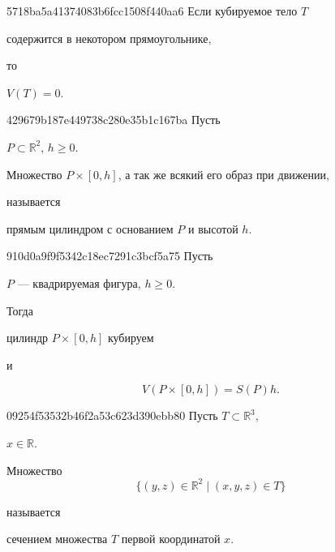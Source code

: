 \begin{note}{5718ba5a41374083b6fcc1508f440aa6}
    Если кубируемое тело \({ T }\) \begin{icloze}{2}содержится в некотором прямоугольнике,\end{icloze} то \begin{icloze}{1}\({ V(T) = 0 }\).\end{icloze}
\end{note}

\begin{note}{429679b187e449738c280e35b1c167ba}
    Пусть \begin{icloze}{3}\({ P \subset \mathbb R^2 }\), \({ h \geqslant 0 }\).\end{icloze}
    \begin{icloze}{1}Множество \({ P \times [0, h] }\), а так же всякий его образ при движении,\end{icloze} называется \begin{icloze}{2}прямым цилиндром с основанием \({ P }\) и высотой \({ h }\).\end{icloze}
\end{note}

\begin{note}{910d0a9f9f5342c18ec7291c3bcf5a75}
    Пусть \begin{icloze}{3}\({ P }\) --- квадрируемая фигура, \({ h \geqslant 0 }\).\end{icloze}
    Тогда \begin{icloze}{1}цилиндр \({ P  \times [0, h] }\) кубируем\end{icloze} и
    \begin{icloze}{2}
        \[
            V(P \times [0, h]) = S(P)h.
        \]
    \end{icloze}
\end{note}

\begin{note}{09254f53532b46f2a53c623d390ebb80}
    Пусть \({ T \subset \mathbb R^3 }\), \begin{icloze}{3}\({ x \in \mathbb R }\).\end{icloze}
    \begin{icloze}{1}
        Множество
        \[
            \Big\{ (y, z) \in \mathbb R^2 \mid (x, y, z) \in T \Big\}
        \]
    \end{icloze}
    называется \begin{icloze}{2}сечением множества \({ T }\) первой координатой \({ x }\).\end{icloze}
\end{note}

